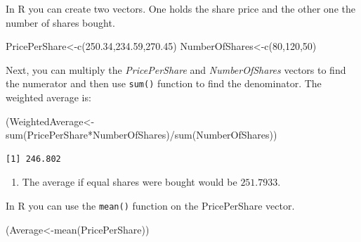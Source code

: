\documentclass[
  letterpaper,
  DIV=11,
  numbers=noendperiod]{scrreprt}
\newenvironment{Shaded}{\begin{snugshade}}{\end{snugshade}}
\newcommand{\DecValTok}[1]{\textcolor[rgb]{0.68,0.00,0.00}{#1}}
\newcommand{\FloatTok}[1]{\textcolor[rgb]{0.68,0.00,0.00}{#1}}
\newcommand{\FunctionTok}[1]{\textcolor[rgb]{0.28,0.35,0.67}{#1}}
\newcommand{\NormalTok}[1]{\textcolor[rgb]{0.00,0.23,0.31}{#1}}
\newcommand{\OtherTok}[1]{\textcolor[rgb]{0.00,0.23,0.31}{#1}}
\newcommand{\SpecialCharTok}[1]{\textcolor[rgb]{0.37,0.37,0.37}{#1}}
\providecommand{\tightlist}{%
  \setlength{\itemsep}{0pt}\setlength{\parskip}{0pt}}\usepackage{longtable,booktabs,array}
\begin{document}
In R you can create two vectors. One holds the share price and the other
one the number of shares bought.

\begin{Shaded}
\begin{Highlighting}[numbers=left,,]
\NormalTok{PricePerShare}\OtherTok{\textless{}{-}}\FunctionTok{c}\NormalTok{(}\FloatTok{250.34}\NormalTok{,}\FloatTok{234.59}\NormalTok{,}\FloatTok{270.45}\NormalTok{)}
\NormalTok{NumberOfShares}\OtherTok{\textless{}{-}}\FunctionTok{c}\NormalTok{(}\DecValTok{80}\NormalTok{,}\DecValTok{120}\NormalTok{,}\DecValTok{50}\NormalTok{)}
\end{Highlighting}
\end{Shaded}

Next, you can multiply the \emph{PricePerShare} and
\emph{NumberOfShares} vectors to find the numerator and then use
\texttt{sum()} function to find the denominator. The weighted average
is:

\begin{Shaded}
\begin{Highlighting}[numbers=left,,]
\NormalTok{(WeightedAverage}\OtherTok{\textless{}{-}}
  \FunctionTok{sum}\NormalTok{(PricePerShare}\SpecialCharTok{*}\NormalTok{NumberOfShares)}\SpecialCharTok{/}\FunctionTok{sum}\NormalTok{(NumberOfShares))}
\end{Highlighting}
\end{Shaded}

\begin{verbatim}
[1] 246.802
\end{verbatim}

\begin{blackbox}

\begin{enumerate}
\def\labelenumi{\arabic{enumi}.}
\setcounter{enumi}{1}
\tightlist
\item
  The average if equal shares were bought would be \(251.7933\).
\end{enumerate}

\end{blackbox}

In R you can use the \texttt{mean()} function on the PricePerShare
vector.

\begin{Shaded}
\begin{Highlighting}[numbers=left,,]
\NormalTok{(Average}\OtherTok{\textless{}{-}}\FunctionTok{mean}\NormalTok{(PricePerShare))}
\end{Highlighting}
\end{Shaded}
\end{document}
